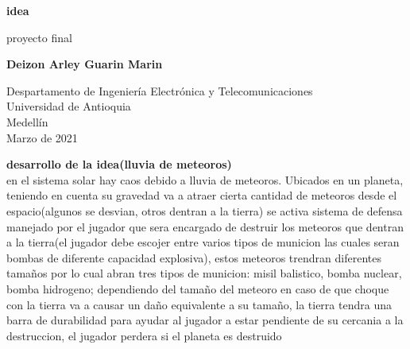 \documentclass{article}
\begin{document}
\begin{titlepage}
    \begin{center}
        \vspace*{1cm}
            
        \Huge
        \textbf{idea}
            
        \vspace{0.5cm}
        \LARGE
        proyecto final
            
        \vspace{1.5cm}
            
        \textbf{Deizon Arley Guarin Marin}
            
        \vfill
            
        \vspace{0.8cm}
            
        \Large
        Despartamento de Ingeniería Electrónica y Telecomunicaciones\\
        Universidad de Antioquia\\
        Medellín\\
        Marzo de 2021
            
    \end{center}
\end{titlepage}


\newpage
\textbf{desarrollo de la idea(lluvia de meteoros)}\\
en el sistema solar hay caos debido a lluvia de meteoros. Ubicados en un planeta, teniendo en cuenta su gravedad va a atraer cierta cantidad de meteoros desde el espacio(algunos se desvian, otros dentran a la tierra) se activa sistema de defensa manejado por el jugador que sera encargado de destruir los meteoros que dentran a la tierra(el jugador debe escojer entre varios tipos de municion las cuales seran bombas de diferente capacidad explosiva), estos meteoros trendran diferentes tamaños por lo cual  abran tres tipos de municion: misil balistico, bomba nuclear, bomba hidrogeno; dependiendo del tamaño del meteoro en caso de que choque con la tierra va a causar un daño equivalente a su tamaño, la tierra tendra una barra de durabilidad para ayudar al jugador a estar pendiente de su cercania a la destruccion, el jugador perdera si el planeta es destruido
\end{document}
